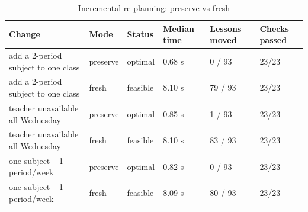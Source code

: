 \begin{table}[t]
\centering
\small
\begin{tabular}{llllll}
\toprule
Change & Mode & Status & Median time & Lessons moved & Checks passed \\
\midrule
add a 2-period subject to one class & preserve & optimal & 0.68 s & 0 / 93 & 23/23 \\
add a 2-period subject to one class & fresh & feasible & 8.10 s & 79 / 93 & 23/23 \\
teacher unavailable all Wednesday & preserve & optimal & 0.85 s & 1 / 93 & 23/23 \\
teacher unavailable all Wednesday & fresh & feasible & 8.10 s & 83 / 93 & 23/23 \\
one subject +1 period/week & preserve & optimal & 0.82 s & 0 / 93 & 23/23 \\
one subject +1 period/week & fresh & feasible & 8.09 s & 80 / 93 & 23/23 \\
\bottomrule
\end{tabular}
\caption{Incremental re-planning: preserve vs fresh}
\label{tab:t6-incremental}
\end{table}
